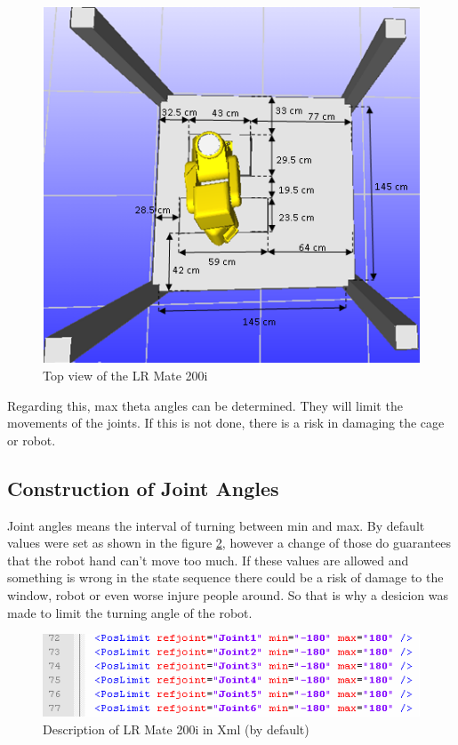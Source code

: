 \begin{figure}[H]
  \centering
  \includegraphics[scale= 0.7]{source/robworkCageDimensions.png}
  \caption{Top view of the LR Mate 200i}
  \label{fig:robworkCageDimensions}
\end{figure}

Regarding this, max theta angles can be determined. They will limit the movements of the joints. If this is not done, there is a risk in damaging the cage or robot.

\subsection{Construction of Joint Angles}
Joint angles means the interval of turning between min and max. By default values were set as shown in the figure \ref{fig:angleDefaultXML}, however a change of those do guarantees that the robot hand can't move too much. If these values are allowed and something is wrong in the state sequence there could be a risk of damage to the window, robot or even worse injure people around. So that is why a desicion was made to limit the turning angle of the robot. 

\begin{figure}[H]
  \centering
  \includegraphics[scale= 0.8]{source/angleDefaultXML.png}
  \caption{Description of LR Mate 200i in Xml (by default)}
  \label{fig:angleDefaultXML}
\end{figure}


